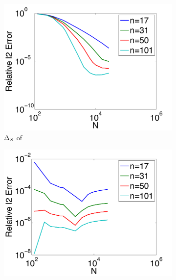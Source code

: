 \begin{figure}[htbp]
	\centering
	\begin{subfigure}[b]{0.425\textwidth}
	\includegraphics[width=1.0\textwidth]{figures/chapter2/compare_weight_generation/lsfc_vs_px_grad_dot_px_grad/direct_rel_l2_error.pdf}
	\caption{$\LaplaceBeltrami$ of }
		\end{subfigure}
	\begin{subfigure}[b]{0.425\textwidth}
\includegraphics[width=1.0\textwidth]{figures/chapter2/compare_weight_generation/xsfc_vs_xsfc_alt_on_sph32/direct_rel_l2_error.pdf}
	\end{subfigure}
	\begin{subfigure}[b]{0.425\textwidth}

\end{subfigure}
\end{figure}
